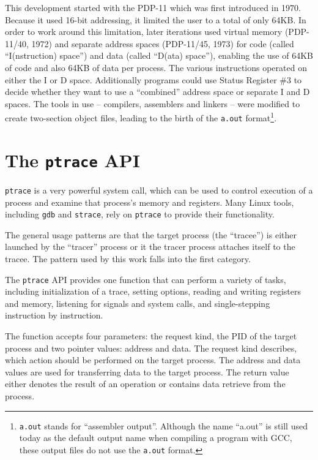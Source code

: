 \documentclass[draft,final]{vutinfth} %
\begin{document}
This development started with the PDP-11 which was first introduced in 1970. Because it used 16-bit addressing, it limited the user to a total of only 64KB. In order to work around this limitation, later iterations used virtual memory (PDP-11/40, 1972\cite[page 6-2]{PDP1140Handbook}) and separate address spaces (PDP-11/45, 1973) for code (called ``I(nstruction) space'') and data (called ``D(ata) space'')\cite[page 145]{PDP1145Handbook}, enabling the use of 64KB of code and also 64KB of data per process. The various instructions operated on either the I or D space. Additionally programs could use Status Register \#3 to decide whether they want to use a ``combined'' address space or separate I and D spaces. The tools in use  -- compilers, assemblers and linkers -- were modified to create two-section object files, leading to the birth of the \texttt{a.out} format\footnote{\texttt{a.out} stands for ``assembler output''. Although the name ``a.out'' is still used today as the default output name when compiling a program with GCC, these output files do not use the \texttt{a.out} format.\cite{RitchieCLangDev}}.

\section{The \texttt{ptrace} API}
\label{ptrace api}

\texttt{ptrace} is a very powerful system call, which can be used to control execution of a process and examine that process's memory and registers. Many Linux tools, including \texttt{gdb} and \texttt{strace}, rely on \texttt{ptrace} to provide their functionality.

The general usage patterns are that the target process (the ``tracee'') is either launched by the ``tracer'' process or it the tracer process attaches itself to the tracee. The pattern used by this work falls into the first category.

The \texttt{ptrace} API provides one function that can perform a variety of tasks, including initialization of a trace, setting options, reading and writing registers and memory, listening for signals and system calls, and single-stepping instruction by instruction.

The function accepts four parameters: the request kind, the PID of the target process and two pointer values: address and data. The request kind describes, which action should be performed on the target process. The address and data values are used for transferring data to the target process. The return value either denotes the result of an operation or contains data retrieve from the process.
\end{document}
